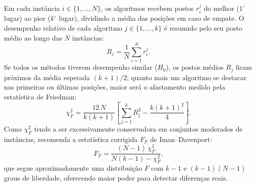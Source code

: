 Em cada instância \(i \in \{1, \dots, N\}\), os algoritmos recebem postos \(r_i^j\) do melhor (\(1^\circ\) lugar) ao pior (\(k^\circ\) lugar), dividindo a média das posições em caso de empate.
O desempenho relativo de cada algoritmo \(j \in \{1, \dots, k\}\) é resumido pelo seu posto médio ao longo das \(N\) instâncias:
\begin{equation}\label{eq:friedman-ranks}
      R_j = \frac{1}{N}\sum_{i=1}^{N} r_i^j\text{.}
\end{equation}
Se todos os métodos tiverem desempenho similar (\(H_0\)), os postos médios \(R_j\) ficam próximos da média esperada \((k+1)/2\); quanto mais um algoritmo se destacar nas primeiras ou últimas posições, maior será o afastamento medido pela estatística de Friedman:
\begin{equation}\label{eq:friedman-chi2}
      \chi_F^2 = \frac{12\,N}{k(k + 1)}\left[\sum_{j=1}^{k} R_j^2 - \frac{k(k + 1)^2}{4}\right]\text{.}
\end{equation}
Como \(\chi_F^2\) tende a ser excessivamente conservadora em conjuntos moderados de instâncias, \textcite{demsar2006statistical} recomenda a estatística corrigida \(F_F\) de Iman--Davenport:
\begin{equation}\label{eq:iman-davenport}
      F_F = \frac{(N - 1)\,\chi_F^2}{N(k - 1) - \chi_F^2}\text{,}
\end{equation}
que segue aproximadamente uma distribuição \(F\) com \(k - 1\) e \((k - 1)(N - 1)\) graus de liberdade, oferecendo maior poder para detectar diferenças reais.

